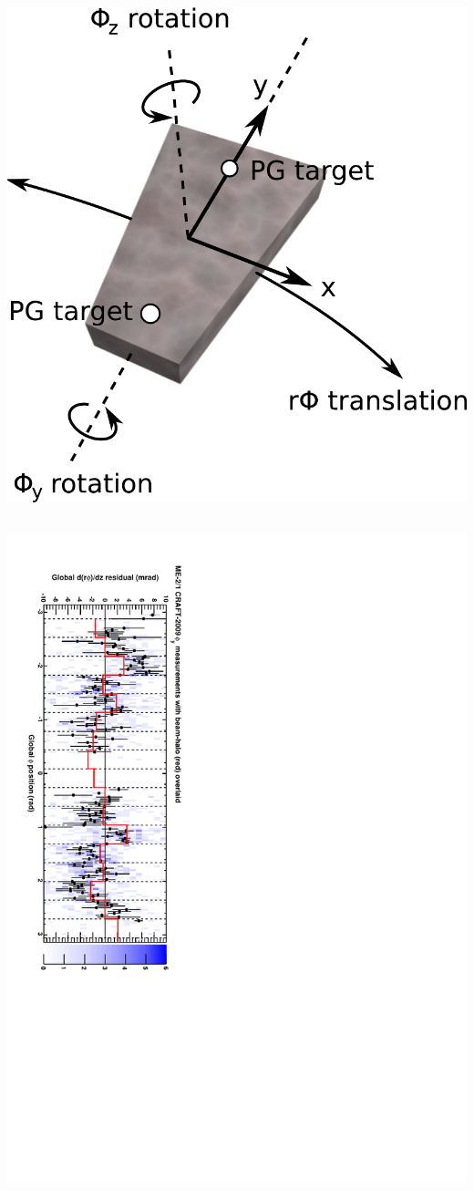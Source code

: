 \documentclass[compress]{beamer}
\begin{document}
\begin{frame}
\begin{columns}
\includegraphics[width=\linewidth]{csc_coordinates.pdf}
\end{columns}

\vspace{0.5 cm}
\includegraphics[height=\linewidth, angle=90]{beamhalo_2009_mem21.pdf}
\end{frame}
\end{document}
